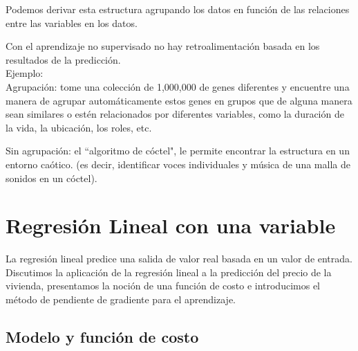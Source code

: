 \documentclass{book}
\begin{document}
Podemos derivar esta estructura agrupando los datos en función de las relaciones entre las variables en los datos.

Con el aprendizaje no supervisado no hay retroalimentación basada en los resultados de la predicción.\\

Ejemplo:\\

Agrupación: tome una colección de 1,000,000 de genes diferentes y encuentre una manera de agrupar automáticamente estos genes en grupos que de alguna manera sean similares o estén relacionados por diferentes variables, como la duración de la vida, la ubicación, los roles, etc.

Sin agrupación: el ``algoritmo de cóctel", le permite encontrar la estructura en un entorno caótico. (es decir, identificar voces individuales y música de una malla de sonidos en un cóctel).

\chapter{Regresión Lineal con una variable}
La regresión lineal predice una salida de valor real basada en un valor de entrada. Discutimos la aplicación de la regresión lineal a la predicción del precio de la vivienda, presentamos la noción de una función de costo e introducimos el método de pendiente de gradiente para el aprendizaje.
\section{Modelo y función de costo}
\end{document}
